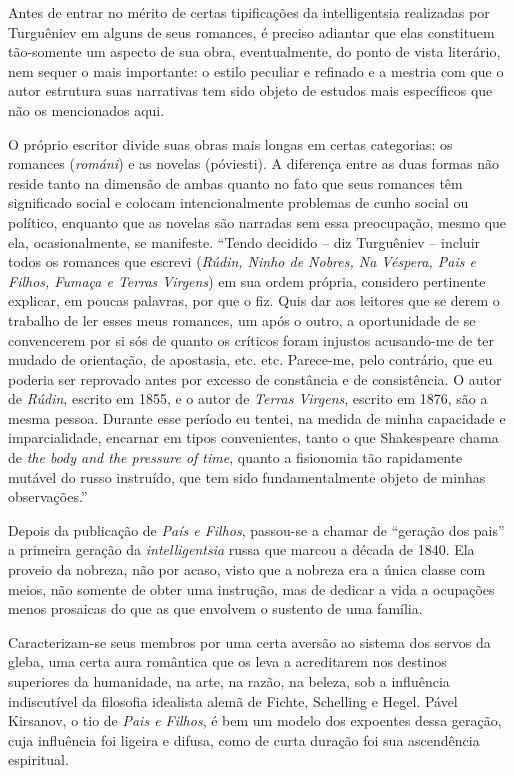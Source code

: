 Antes de entrar no mérito de certas tipificações da intelligentsia
realizadas por Turguêniev em alguns de seus romances, é preciso adiantar
que elas constituem tão-somente um aspecto de sua obra, eventualmente,
do ponto de vista literário, nem sequer o mais importante: o estilo
peculiar e refinado e a mestria com que o autor estrutura suas
narrativas tem sido objeto de estudos mais específicos que não os
mencionados aqui.

O próprio escritor divide suas obras mais longas em certas categorias:
os romances (\emph{románi}) e as novelas (póviesti). A diferença entre
as duas formas não reside tanto na dimensão de ambas quanto no fato que
seus romances têm significado social e colocam intencionalmente
problemas de cunho social ou político, enquanto que as novelas são
narradas sem essa preocupação, mesmo que ela, ocasionalmente, se
manifeste. ``Tendo decidido -- diz Turguêniev -- incluir todos os
romances que escrevi (\emph{Rúdin, Ninho de Nobres, Na Véspera, Pais e
Filhos, Fumaça e Terras Virgens}) em sua ordem própria, considero
pertinente explicar, em poucas palavras, por que o fiz. Quis dar aos
leitores que se derem o trabalho de ler esses meus romances, um após o
outro, a oportunidade de se convencerem por si sós de quanto os críticos
foram injustos acusando-me de ter mudado de orientação, de apostasia,
etc. etc. Parece-me, pelo contrário, que eu poderia ser reprovado antes
por excesso de constância e de consistência. O autor de \emph{Rúdin},
escrito em 1855, e o autor de \emph{Terras Virgens}, escrito em 1876,
são a mesma pessoa. Durante esse período eu tentei, na medida de minha
capacidade e imparcialidade, encarnar em tipos convenientes, tanto o que
Shakespeare chama de \emph{the body and the pressure of time}, quanto a
fisionomia tão rapidamente mutável do russo instruído, que tem sido
fundamentalmente objeto de minhas observações.''

Depois da publicação de \emph{País e Filhos}, passou-se a chamar de
``geração dos pais'' a primeira geração da \emph{intelligentsia} russa
que marcou a década de 1840. Ela proveio da nobreza, não por acaso,
visto que a nobreza era a única classe com meios, não somente de obter
uma instrução, mas de dedicar a vida a ocupações menos prosaicas do que
as que envolvem o sustento de uma família.

Caracterizam-se seus membros por uma certa aversão ao sistema dos servos
da gleba, uma certa aura romântica que os leva a acreditarem nos
destinos superiores da humanidade, na arte, na razão, na beleza, sob a
influência indiscutível da filosofia idealista alemã de Fichte,
Schelling e Hegel. Pável Kirsanov, o tio de \emph{Pais e Filhos}, é bem
um modelo dos expoentes dessa geração, cuja influência foi ligeira e
difusa, como de curta duração foi sua ascendência espiritual.

